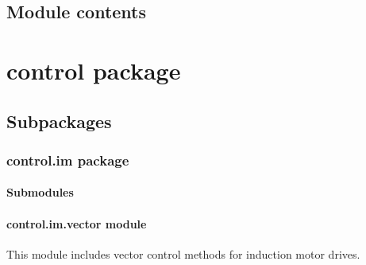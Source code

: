 \documentclass[letterpaper,10pt,english]{sphinxmanual}
\begin{document}
\subsection{Module contents}
\label{\detokenize{config:module-config}}\label{\detokenize{config:module-contents}}
\sphinxstepscope


\section{control package}
\label{\detokenize{control:control-package}}\label{\detokenize{control::doc}}

\subsection{Subpackages}
\label{\detokenize{control:subpackages}}
\sphinxstepscope


\subsubsection{control.im package}
\label{\detokenize{control.im:control-im-package}}\label{\detokenize{control.im::doc}}

\paragraph{Submodules}
\label{\detokenize{control.im:submodules}}

\paragraph{control.im.vector module}
\label{\detokenize{control.im:module-control.im.vector}}\label{\detokenize{control.im:control-im-vector-module}}
\sphinxAtStartPar
This module includes vector control methods for induction motor drives.
\end{document}
